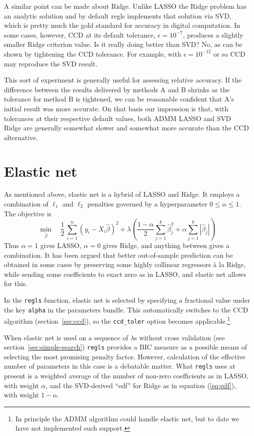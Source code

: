 \documentclass{article}
\begin{document}
A similar point can be made about Ridge. Unlike LASSO the Ridge
problem has an analytic solution and by default \textsf{regls}
implements that solution via SVD, which is pretty much the gold
standard for accuracy in digital computation. In some cases, however,
CCD at its default tolerance, $\epsilon = 10^{-7}$, produces a
slightly smaller Ridge criterion value. Is it really doing better than
SVD? No, as can be shown by tightening the CCD tolerance. For example,
with $\epsilon = 10^{-12}$ or so CCD may reproduce the SVD result.

This sort of experiment is generally useful for assessing relative
accuracy. If the difference between the results delivered by methods A
and B shrinks as the tolerance for method B is tightened, we can be
reasonable confident that A's initial result was more accurate. On
that basis our impression is that, with tolerances at their respective
default values, both ADMM LASSO and SVD Ridge are generally somewhat
slower and somewhat more accurate than the CCD alternative.

\section{Elastic net}
\label{sec:elnet}

As mentioned above, elastic net is a hybrid of LASSO and Ridge. It
employs a combination of $\ell_1$ and $\ell_2$ penalties governed by a
hyperparameter $0 \leq \alpha \leq 1$. The objective is
\[
    \min_{\hat{\beta}} \quad \frac{1}{2}\,
    \sum_{i=1}^n (y_i - X_i\hat{\beta})^2 +
    \lambda \left(\frac{1-\alpha}{2} \sum_{j=1}^k \hat{\beta}_j^2
      + \alpha \sum_{j=1}^k |\hat{\beta}_j|\right)
  \]
Thus $\alpha = 1$ gives LASSO, $\alpha = 0$ gives Ridge, and anything
between gives a combination. It has been argued that better
out-of-sample prediction can be obtained in some cases by preserving
some highly collinear regressors \`a la Ridge, while sending some
coefficients to exact zero as in LASSO, and elastic net allows for
this.

In the \texttt{regls} function, elastic net is selected by specifying
a fractional value under the key \texttt{alpha} in the parameters
bundle. This automatically switches to the CCD algorithm
(section~\ref{sec:ccd}), so the \texttt{ccd\_toler} option becomes
applicable.\footnote{In principle the ADMM algorithm could handle
  elastic net, but to date we have not implemented such support.}

When elastic net is used on a sequence of $\lambda$s without cross
validation (see section~\ref{sec:simple-search}) \texttt{regls}
provides a BIC measure as a possible means of selecting the most
promising penalty factor. However, calculation of the effective number
of parameters in this case is a debatable matter. What \texttt{regls}
uses at present is a weighted average of the number of non-zero
coefficients as in LASSO, with weight $\alpha$, and the SVD-derived
``edf'' for Ridge as in equation (\ref{eq:edf}), with weight
$1-\alpha$.
\end{document}
